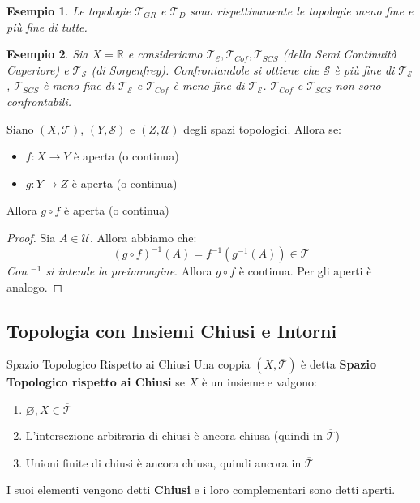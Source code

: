 \documentclass[11pt,a4paper,twoside]{article}
\newtheorem{es}{Esempio}
\theoremstyle{definition}
\begin{document}
\begin{es}
	Le topologie $\mathcal T_{GR}$ e $\mathcal T_D$ sono rispettivamente le topologie meno fine e più fine di tutte.
\end{es}

\begin{es}
	Sia $X = \mathbb R$ e consideriamo $\mathcal T_\mathcal E, \mathcal T_{Cof}, \mathcal T_{SCS}$ (della Semi Continuità Cuperiore) e $\mathcal T_\mathcal S$ (di Sorgenfrey). Confrontandole si ottiene che $\mathcal S$ è più fine di $\mathcal T_\mathcal E$, $\mathcal T_{SCS}$ è meno fine di $\mathcal T_\mathcal E$ e $\mathcal T_{Cof}$ è meno fine di $\mathcal T_\mathcal E$. $\mathcal T_{Cof}$ e $\mathcal T_{SCS}$ non sono confrontabili.
\end{es}

\begin{prop}{}{}
	Siano $(X, \mathcal T)$, $(Y, \mathcal S)$ e $(Z, \mathcal U)$ degli spazi topologici. Allora se:
	\begin{itemize}
		\item $f \colon X \to Y$ è aperta (o continua)
		\item $g \colon Y \to Z$ è aperta (o continua)
	\end{itemize}
	Allora $g \circ f$ è aperta (o continua)
\end{prop}

\begin{proof}
	Sia $A \in \mathcal U$. Allora abbiamo che:
	\[(g \circ f)^{-1}(A) = f^{-1}(g^{-1}(A)) \in\mathcal T\]
	\textit{Con ${}^{-1}$ si intende la preimmagine}. Allora $g\circ f$ è continua. Per gli aperti è analogo.
\end{proof}

\subsection{Topologia con Insiemi Chiusi e Intorni}

\begin{defn}{Spazio Topologico Rispetto ai Chiusi}{}
	Una coppia $(X, \overline{\mathcal T})$ è detta \textbf{Spazio Topologico rispetto ai Chiusi} se $X$ è un insieme e valgono:
	\begin{enumerate}
		\item $\varnothing, X \in \overline {\mathcal T}$
		\item L'intersezione arbitraria di chiusi è ancora chiusa (quindi in $\overline {\mathcal T}$)
		\item Unioni finite di chiusi è ancora chiusa, quindi ancora in $\overline{\mathcal T}$
	\end{enumerate}
	I suoi elementi vengono detti \textbf{Chiusi} e i loro complementari sono detti aperti.
\end{defn}
\end{document}
